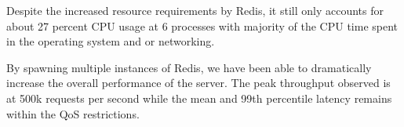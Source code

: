 Despite the increased resource requirements by Redis, it still only accounts for about 27 percent CPU usage at 6 processes with majority of the CPU time spent in the operating system and or networking.


By spawning multiple instances of Redis, we have been able to dramatically increase the overall performance of the server. The peak throughput observed is at 500k requests per second while the mean and 99th percentile latency remains within the QoS restrictions.



